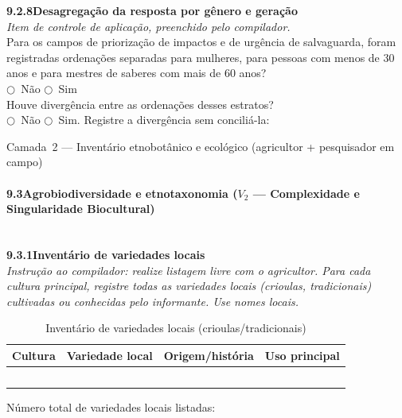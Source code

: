 \medskip\noindent\textbf{9.2.8\quad Desagregação da resposta por gênero e geração}\\[2pt]
\textit{Item de controle de aplicação, preenchido pelo compilador.}\\[2pt]
Para os campos de priorização de impactos e de urgência de salvaguarda, foram registradas ordenações separadas para mulheres, para pessoas com menos de 30 anos e para mestres de saberes com mais de 60 anos?\\
$\bigcirc$~Não \quad $\bigcirc$~Sim\\[2pt]
Houve divergência entre as ordenações desses estratos?\\
$\bigcirc$~Não \quad $\bigcirc$~Sim. Registre a divergência sem conciliá-la: \dotfill\\[2pt]\dotfill

{Camada~2 --- Inventário etnobotânico e ecológico (agricultor + pesquisador em campo)}

\paragraph{9.3\quad Agrobiodiversidade e etnotaxonomia ($V_2$ --- Complexidade e Singularidade Biocultural)}~\\[4pt]

\noindent\textbf{9.3.1\quad Inventário de variedades locais}\\[2pt]
\textit{Instrução ao compilador: realize listagem livre com o agricultor. Para cada cultura principal, registre todas as variedades locais (crioulas, tradicionais) cultivadas ou conhecidas pelo informante. Use nomes locais.}

\begin{table}[htbp]
\centering\small
\caption{Inventário de variedades locais (crioulas/tradicionais)}
\label{tab:app_variedades}
\begin{tabular}{p{3.2cm}p{3.5cm}p{3.5cm}p{2.5cm}}
\toprule
\textbf{Cultura} & \textbf{Variedade local} & \textbf{Origem/história} & \textbf{Uso principal} \\
\midrule
& & & \\
& & & \\
& & & \\
& & & \\
& & & \\
\bottomrule
\end{tabular}
\end{table}

\noindent Número total de variedades locais listadas: \dotfill

